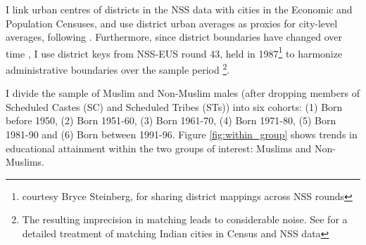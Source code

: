 \documentclass{article}
\begin{document}
I link urban centres of districts in the NSS data with cities in the Economic and Population Censuses, and use district urban averages as proxies for city-level averages, following \cite{greenstone2014environmental}. Furthermore, since district boundaries have changed over time \citep{somanathan2009mapping}, I use district keys from NSS-EUS round 43, held in 1987\footnote{courtesy Bryce Steinberg, for sharing district mappings across NSS rounds} to harmonize administrative boundaries over the sample period \footnote{The resulting imprecision in matching leads to considerable noise. See \cite{harari2020cities} for a detailed treatment of matching Indian cities in Census and NSS data}.

I divide the sample of Muslim and Non-Muslim males (after dropping members of Scheduled Castes (SC) and Scheduled Tribes (STs)) into six cohorts: (1) Born before 1950, (2) Born 1951-60, (3) Born 1961-70, (4) Born 1971-80, (5) Born 1981-90 and (6) Born between 1991-96. Figure \ref{fig:within_group} shows trends in educational attainment within the two groups of interest: Muslims and Non-Muslims. %
\end{document}
